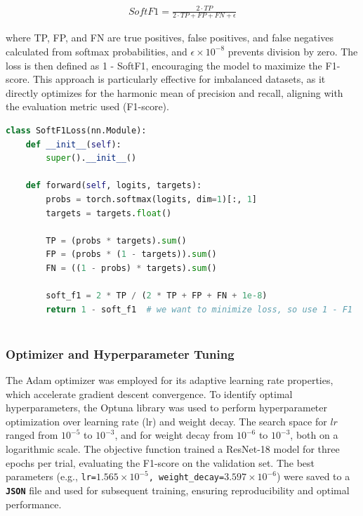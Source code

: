 \begin{align*}
	\textit{Soft}F1 = \frac{2 \cdot TP}{2 \cdot TP + FP + FN + \epsilon}
\end{align*}

where TP, FP, and FN are true positives, false positives, and false negatives calculated from softmax probabilities, and $\epsilon\times10^{-8}$ prevents division by zero. The loss is then defined as 1 - SoftF1, encouraging the model to maximize the F1-score. This approach is particularly effective for imbalanced datasets, as it directly optimizes for the harmonic mean of precision and recall, aligning with the evaluation metric used (F1-score).

\begin{lstlisting}[language=Python]
class SoftF1Loss(nn.Module):
	def __init__(self):
		super().__init__()

	def forward(self, logits, targets):
		probs = torch.softmax(logits, dim=1)[:, 1]
		targets = targets.float()
	
		TP = (probs * targets).sum()
		FP = (probs * (1 - targets)).sum()
		FN = ((1 - probs) * targets).sum()
		
		soft_f1 = 2 * TP / (2 * TP + FP + FN + 1e-8)
		return 1 - soft_f1  # we want to minimize loss, so use 1 - F1
	
\end{lstlisting}

\subsubsection{Optimizer and Hyperparameter Tuning}

The Adam optimizer was employed for its adaptive learning rate properties, which accelerate gradient descent convergence. To identify optimal hyperparameters, the Optuna library was used to perform hyperparameter optimization over learning rate (lr) and weight decay. The search space for $lr$ ranged from $10^{-5}$ to $10^{-3}$, and for weight decay from $10^{-6}$ to $10^{-3}$, both on a logarithmic scale. The objective function trained a ResNet-18 model for three epochs per trial, evaluating the F1-score on the validation set. The best parameters (e.g., \texttt{lr=$1.565\times10^{-5}$, weight\_decay=$3.597\times10^{-6}$}) were saved to a \textbf{\texttt{JSON}} file and used for subsequent training, ensuring reproducibility and optimal performance.

